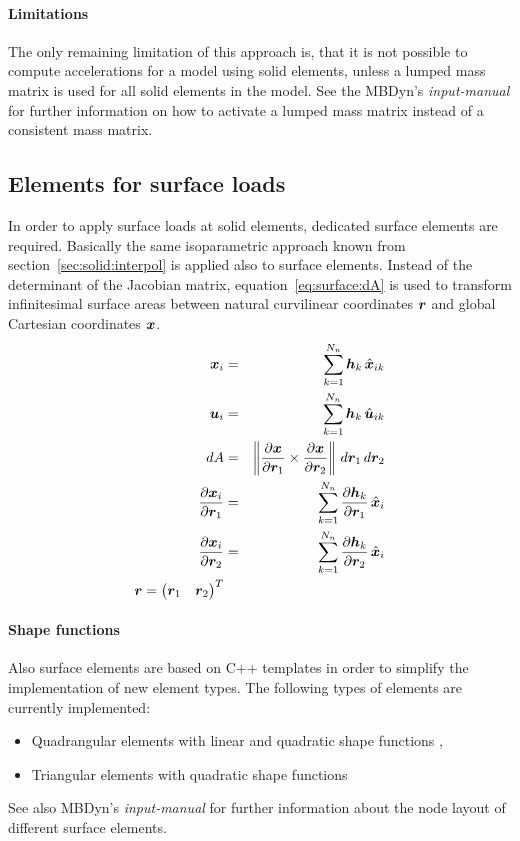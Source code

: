 \paragraph{Limitations}
The only remaining limitation of this approach is, that it is not possible to compute accelerations
for a model using solid elements, unless a lumped mass matrix is used for all solid elements in the model.
See the MBDyn's \emph{input-manual} for further information on how to activate a lumped mass matrix
instead of a consistent mass matrix.

\subsection{Elements for surface loads}
In order to apply surface loads at solid elements, dedicated surface elements are required.
Basically the same isoparametric approach known from section~\ref{sec:solid:interpol} is applied also to surface elements.
Instead of the determinant of the Jacobian matrix, equation~\ref{eq:surface:dA} is used to transform infinitesimal surface areas
between natural curvilinear coordinates $\bm{r}$ and global Cartesian coordinates $\bm{x}$.
\begin{eqnarray}
\bm{x}_i & = & \sum_{k=1}^{N_n} \bm{h}_k \, \hat{\bm{x}}_{ik} \\
\bm{u}_i & = & \sum_{k=1}^{N_n} \bm{h}_k \, \hat{\bm{u}}_{ik} \\
dA & = & \left\Vert\frac{\partial \bm{x}}{\partial \bm{r}_1} \times \frac{\partial \bm{x}}{\partial \bm{r}_2} \right\Vert \,d\bm{r}_1 \, d\bm{r}_2 \label{eq:surface:dA} \\
\frac{\partial \bm{x}_i}{\partial \bm{r}_1} & = &\sum_{k=1}^{N_n} \frac{\partial \bm{h}_{k}}{\partial \bm{r}_1} \, \hat{\bm{x}}_i \\
\frac{\partial \bm{x}_i}{\partial \bm{r}_2} & = &\sum_{k=1}^{N_n} \frac{\partial \bm{h}_{k}}{\partial \bm{r}_2} \, \hat{\bm{x}}_i \\
\bm{r}=\begin{pmatrix} \bm{r}_1 & \bm{r}_2 \end{pmatrix}^T
\end{eqnarray}
\paragraph{Shape functions}
Also surface elements are based on C++ templates in order to simplify the implementation of new element types.
The following types of elements are currently implemented:
\begin{itemize}
\item Quadrangular elements with linear and quadratic shape functions \cite{BATHE2016}, \cite{DHONDT2004}
\item Triangular elements with quadratic shape functions \cite{CODEASTERR30301}
\end{itemize}
See also MBDyn's \emph{input-manual} for further information about the node layout of different surface elements.

